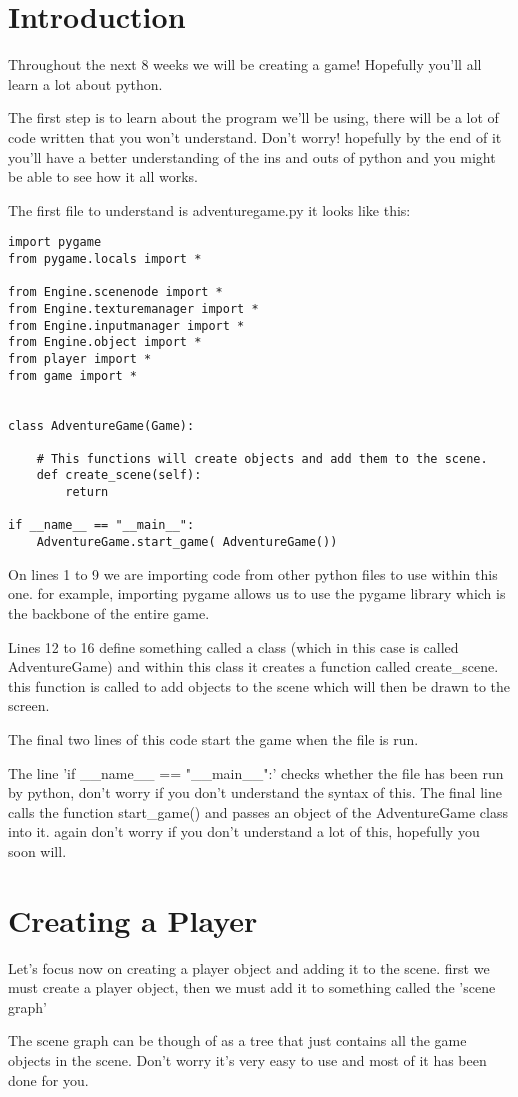 \documentclass[11pt]{article}
\begin{document}
\section*{Introduction}
Throughout the next 8 weeks we will be creating a game! Hopefully you'll all learn a lot about python.

The first step is to learn about the program we'll be using, there will be a lot of code written that you won't understand. Don't worry! hopefully by the end of it you'll have a better understanding of the ins and outs of python and you might be able to see how it all works.

The first file to understand is adventuregame.py 
it looks like this:
\begin{lstlisting}
import pygame
from pygame.locals import *

from Engine.scenenode import *
from Engine.texturemanager import *
from Engine.inputmanager import *
from Engine.object import *
from player import *
from game import *


class AdventureGame(Game):

    # This functions will create objects and add them to the scene.
    def create_scene(self):
        return

if __name__ == "__main__":
    AdventureGame.start_game( AdventureGame())
\end{lstlisting}
On lines 1 to 9 we are importing code from other python files to use within this one. for example, importing pygame allows us to use the pygame library which is the backbone of the entire game.

Lines 12 to 16 define something called a class (which in this case is called AdventureGame) and within this class it creates a function called create\_scene. this function is called to add objects to the scene which will then be drawn to the screen.

The final two lines of this code start the game when the file is run. 

The line 'if \_\_name\_\_ == "\_\_main\_\_":' checks whether the file has been run by python, don't worry if you don't understand the syntax of this.
The final line calls the function start\_game() and passes an object of the AdventureGame class into it. again don't worry if you don't understand a lot of this, hopefully you soon will.

\section*{Creating a Player}
Let's focus now on creating a player object and adding it to the scene. first we must create a player object, then we must add it to something called the 'scene graph'
 
 The scene graph can be though of as a tree that just contains all the game objects in the scene. Don't worry it's very easy to use and most of it has been done for you.
 
\end{document}
